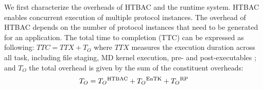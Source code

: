 We first characterize the overheads of HTBAC and the runtime system. HTBAC
enables concurrent execution of multiple protocol  instances. The overhead of HTBAC depends  on the
number of protocol instances that need to be generated for an application.
The total time to completion (TTC)  can be expressed as
following: $TTC = TTX + T_{O}$ where \(TTX\) measures the execution duration
across all task, including file staging, MD kernel execution, pre- and
post-executables ; and $T_{O}$ the total overhead is  given by the sum of the constituent
overheads: $$T_{O} = T_{O}\textsuperscript{HTBAC} +
T_{O}\textsuperscript{EnTK} + T_{O}\textsuperscript{RP}$$ 




